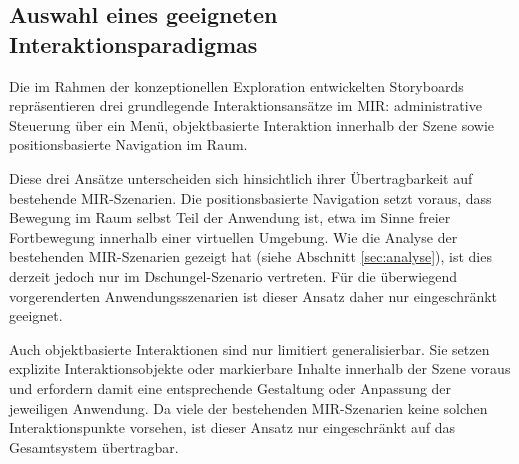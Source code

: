 \subsection{Auswahl eines geeigneten Interaktionsparadigmas}
\label{sec:synthese_auswahl}



Die im Rahmen der konzeptionellen Exploration entwickelten Storyboards repräsentieren drei grundlegende Interaktionsansätze im MIR: administrative Steuerung über ein Menü, objektbasierte Interaktion innerhalb der Szene sowie positionsbasierte Navigation im Raum. 

Diese drei Ansätze unterscheiden sich hinsichtlich ihrer Übertragbarkeit auf bestehende MIR-Szenarien. Die positionsbasierte Navigation setzt voraus, dass Bewegung im Raum selbst Teil der Anwendung ist, etwa im Sinne freier Fortbewegung innerhalb einer virtuellen Umgebung. Wie die Analyse der bestehenden MIR-Szenarien gezeigt hat (siehe Abschnitt \ref{sec:analyse}), ist dies derzeit jedoch nur im Dschungel-Szenario vertreten. Für die überwiegend vorgerenderten Anwendungsszenarien ist dieser Ansatz daher nur eingeschränkt geeignet.

Auch objektbasierte Interaktionen sind nur limitiert generalisierbar. Sie setzen explizite Interaktionsobjekte oder markierbare Inhalte innerhalb der Szene voraus und erfordern damit eine entsprechende Gestaltung oder Anpassung der jeweiligen Anwendung. Da viele der bestehenden MIR-Szenarien keine solchen Interaktionspunkte vorsehen, ist dieser Ansatz nur eingeschränkt auf das Gesamtsystem übertragbar.

